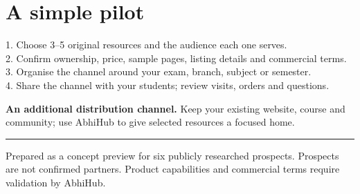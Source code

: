 \documentclass[10pt]{article}
\begin{document}
\section{A simple pilot}
1. Choose 3--5 original resources and the audience each one serves.\\
2. Confirm ownership, price, sample pages, listing details and commercial terms.\\
3. Organise the channel around your exam, branch, subject or semester.\\
4. Share the channel with your students; review visits, orders and questions.\par\vspace{4mm}
{\small\color{muted}\textbf{An additional distribution channel.} Keep your existing website, course and community; use AbhiHub to give selected resources a focused home.}\par\vfill\hrule\vspace{2mm}
{\footnotesize\color{muted}Prepared as a concept preview for six publicly researched prospects. Prospects are not confirmed partners. Product capabilities and commercial terms require validation by AbhiHub.}
\end{document}
